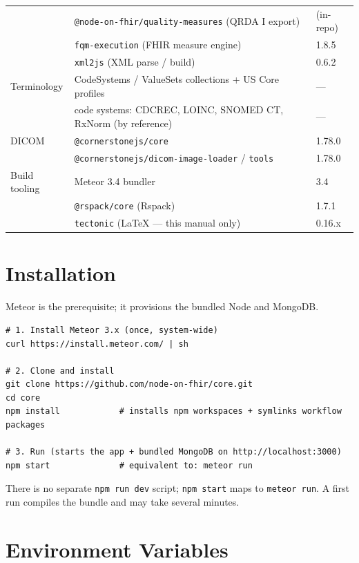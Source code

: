 \begin{longtable}{lll}
                 & \texttt{@node-on-fhir/quality-measures} (QRDA I export) & (in-repo) \\
                 & \texttt{fqm-execution} (FHIR measure engine) & 1.8.5 \\
                 & \texttt{xml2js} (XML parse / build) & 0.6.2 \\
\midrule
Terminology      & CodeSystems / ValueSets collections + US Core profiles & --- \\
                 & code systems: CDCREC, LOINC, SNOMED CT, RxNorm (by reference) & --- \\
\midrule
DICOM            & \texttt{@cornerstonejs/core} & 1.78.0 \\
                 & \texttt{@cornerstonejs/dicom-image-loader} / \texttt{tools} & 1.78.0 \\
\midrule
Build tooling    & Meteor 3.4 bundler & 3.4 \\
                 & \texttt{@rspack/core} (Rspack) & 1.7.1 \\
                 & \texttt{tectonic} (LaTeX --- this manual only) & 0.16.x \\
\end{longtable}

\section{Installation}

Meteor is the prerequisite; it provisions the bundled Node and MongoDB.

\begin{lstlisting}
# 1. Install Meteor 3.x (once, system-wide)
curl https://install.meteor.com/ | sh

# 2. Clone and install
git clone https://github.com/node-on-fhir/core.git
cd core
npm install            # installs npm workspaces + symlinks workflow packages

# 3. Run (starts the app + bundled MongoDB on http://localhost:3000)
npm start              # equivalent to: meteor run
\end{lstlisting}

There is no separate \texttt{npm run dev} script; \texttt{npm start} maps to
\texttt{meteor run}. A first run compiles the bundle and may take several
minutes.

\section{Environment Variables}

